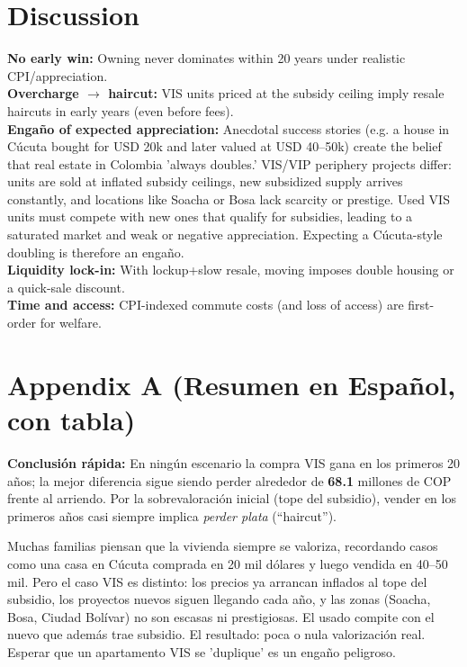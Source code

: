 \documentclass[12pt]{article}
\begin{document}
\section*{Discussion}
\textbf{No early win:} Owning never dominates within 20 years under realistic CPI/appreciation.\\
\textbf{Overcharge $\rightarrow$ haircut:} VIS units priced at the subsidy ceiling imply resale haircuts in early years (even before fees).\\
\textbf{Engaño of expected appreciation:} Anecdotal success stories (e.g. a house in Cúcuta bought for USD 20k and later valued at USD 40–50k) create the belief that real estate in Colombia 'always doubles.' VIS/VIP periphery projects differ: units are sold at inflated subsidy ceilings, new subsidized supply arrives constantly, and locations like Soacha or Bosa lack scarcity or prestige. Used VIS units must compete with new ones that qualify for subsidies, leading to a saturated market and weak or negative appreciation. Expecting a Cúcuta-style doubling is therefore an engaño. \\

\textbf{Liquidity lock-in:} With lockup+slow resale, moving imposes double housing or a quick-sale discount.\\
\textbf{Time and access:} CPI-indexed commute costs (and loss of access) are first-order for welfare.

\section*{Appendix A (Resumen en Español, con tabla)}
\textbf{Conclusión rápida:} En ningún escenario la compra VIS gana en los primeros 20 años; la mejor diferencia sigue siendo perder alrededor de \textbf{68.1} millones de COP frente al arriendo. Por la sobrevaloración inicial (tope del subsidio), vender en los primeros años casi siempre implica \emph{perder plata} (``haircut''). 

Muchas familias piensan que la vivienda siempre se valoriza, recordando casos como una casa en Cúcuta comprada en 20 mil dólares y luego vendida en 40--50 mil. Pero el caso VIS es distinto: los precios ya arrancan inflados al tope del subsidio, los proyectos nuevos siguen llegando cada año, y las zonas (Soacha, Bosa, Ciudad Bolívar) no son escasas ni prestigiosas. El usado compite con el nuevo que además trae subsidio. El resultado: poca o nula valorización real. Esperar que un apartamento VIS se 'duplique' es un engaño peligroso.
\end{document}

